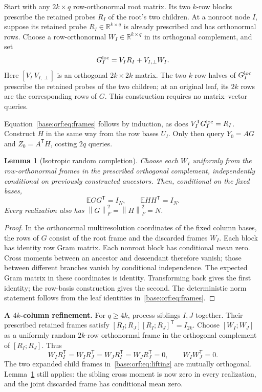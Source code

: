 \documentclass[11pt,oneside,openany,a4paper]{book}
\numberwithin{equation}{chapter}
\newtheorem{lemma}[theorem]{Lemma}
\theoremstyle{definition}
\theoremstyle{remark}
\newcommand{\R}{\mathbb R}\newcommand{\E}{\mathbb E}\newcommand{\Prb}{\mathbb P}\newcommand{\PP}{\mathbb P}
\newcommand{\T}{\mathsf T}\newcommand{\Id}{I}
\newcommand{\F}[1]{\left\lVert#1\right\rVert_F}
\begin{document}
Start with any $2k\times q$ row-orthonormal root matrix. Its two $k$-row
blocks prescribe the retained probes $R_I$ of the root's two children.
At a nonroot node $I$, suppose its retained probe $R_I\in\R^{k\times q}$
is already prescribed and has orthonormal rows. Choose a row-orthonormal
$W_I\in\R^{k\times q}$ in its orthogonal complement, and set
\begin{equation}\label{base:orf:eq:lifting}
 G_I^{\rm loc}=V_I R_I+V_{I,\perp}W_I.
\end{equation}
Here $[V_I\ V_{I,\perp}]$ is an orthogonal $2k\times2k$ matrix.
The two $k$-row halves of $G_I^{\rm loc}$ prescribe the retained probes of
the two children; at an original leaf, its $2k$ rows are the corresponding
rows of $G$. This construction requires no matrix--vector queries.

Equation~\eqref{base:orf:eq:frames} follows by induction, as does
$V_I^{\T}G_I^{\rm loc}=R_I$. Construct $H$ in the same way from the row
bases $U_I$. Only then query $Y_0=AG$ and $Z_0=A^{\T}H$, costing $2q$ queries.

\begin{lemma}[Isotropic random completion]\label{base:orf:lem:isotropy}
Choose each $W_I$ uniformly from the row-orthonormal frames in the prescribed
orthogonal complement, independently conditional on previously constructed
ancestors. Then, conditional on the fixed bases,
\begin{equation}\label{base:orf:eq:isotropy}
 \E GG^{\T}=I_N,\qquad \E HH^{\T}=I_N.
\end{equation}
Every realization also has $\F G^2=\F H^2=N$.
\end{lemma}
\begin{proof}
In the orthonormal multiresolution coordinates of the fixed column bases,
the rows of $G$ consist of the root frame and the discarded frames $W_I$.
Each block has identity row Gram matrix. Each nonroot block has conditional
mean zero. Cross moments between an ancestor and descendant therefore
vanish; those between different branches vanish by conditional independence.
The expected Gram matrix in these coordinates is identity. Transforming
back gives the first identity; the row-basis construction gives the second.
The deterministic norm statement follows from the leaf identities
in~\eqref{base:orf:eq:frames}.
\end{proof}

\textbf{A $4k$-column refinement.}
For $q\ge4k$, process siblings $I,J$ together. Their prescribed retained
frames satisfy $[R_I;R_J][R_I;R_J]^{\T}=I_{2k}$. Choose
$[W_I;W_J]$ as a uniformly random $2k$-row orthonormal frame in the
orthogonal complement of $[R_I;R_J]$. Thus
\begin{equation}\label{base:orf:eq:siblings}
 W_I R_I^{\T}=W_I R_J^{\T}=W_J R_I^{\T}=W_J R_J^{\T}=0,
 \qquad W_IW_J^{\T}=0.
\end{equation}
The two expanded child frames in~\eqref{base:orf:eq:lifting} are mutually
orthogonal. Lemma~\ref{base:orf:lem:isotropy} still applies: the sibling cross
moment is now zero in every realization, and the joint discarded frame
has conditional mean zero.
\end{document}
